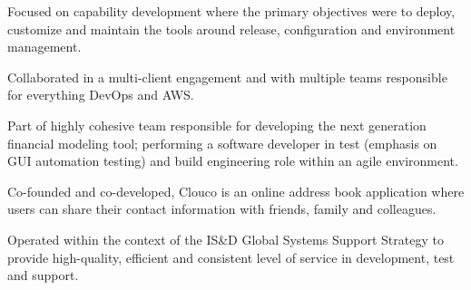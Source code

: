 \documentclass[]{cv}
\begin{document}
\begin{minipage}[t]{1.0\textwidth}
\begin{tightemize}
\item Focused on capability development where the primary objectives were to deploy, customize and maintain the tools around release, configuration and environment management.
\end{tightemize}
\sectionsep
\sectionsep
{}
\begin{tightemize}
\item Collaborated in a multi-client engagement and with multiple teams responsible for everything DevOps and AWS\@.
\end{tightemize}
\sectionsep
\sectionsep
{}
\begin{tightemize}
\item Part of highly cohesive team responsible for developing the next generation financial modeling tool; performing a software developer in test (emphasis on GUI automation testing) and build engineering role within an agile environment.
\end{tightemize}
\sectionsep
\sectionsep
{}
\begin{tightemize}
\item Co-founded and co-developed, Clouco is an online address book application where users can share their contact information with friends, family and colleagues.
\end{tightemize}
\sectionsep
\sectionsep
{}
\begin{tightemize}
\item Operated within the context of the IS\&D Global Systems Support Strategy to provide high-quality, efficient and consistent level of service in development, test and support.
\end{tightemize}
\sectionsep
\sectionsep
{}
\begin{tightemize}

\end{tightemize}
\end{minipage}
\end{document}
